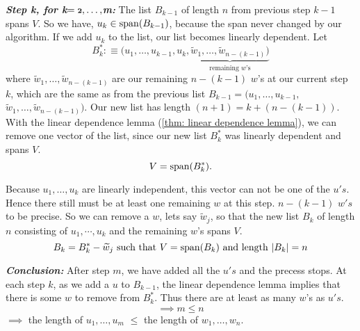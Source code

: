 \begin{prf}
  \emph{\bfseries Step k, for k$=\mathbf{\mathsmaller{2}, \ldots,}$m:} The list $B_{k-1}$ of length $n$ from previous step $k-1$ spans $V$. So we have, $u_k \in \operatorname{span} (B_{k-1})$, because the span never changed by our algorithm. If we add $u_k$ to the list, our list becomes linearly dependent. Let
  \begin{equation*}
    B_k^* :\equiv (u_1, \ldots, u_{k-1}, u_k, \underbrace{\widetilde w_{1}, \ldots, \widetilde w_{n-(k-1)})}_{\text{remaining $w$'s}} 
  \end{equation*}
  where $\widetilde w_{1}, \ldots, \widetilde w_{n-(k-1)}$ are our remaining $n-(k-1)$ $w$'s at our current step $k$, which are the same as from the previous list $B_{k-1}$$=$$(u_1, \ldots,u_{k-1},$$ \widetilde w_{1}, \ldots, \widetilde w_{n-(k-1)})$. Our new list has length $(n+1) = k + (n-(k-1))$. With the linear dependence lemma (\ref{thm: linear dependence lemma}), we can remove one vector of the list, since our new list $B_{k}^*$ was linearly dependent and spans $V$. 
  \begin{equation*}
    V=\operatorname{span} (B_{k}^*). 
  \end{equation*}
  
  Because $u_1, \ldots, u_k$ are linearly independent, this vector can not be one of the $u's$. Hence there still must be at least one remaining $w$ at this step. $n-(k-1)$ $w's$ to be precise. So we can remove a $w$, lets say $\widetilde w_j$, so that the new list $B_k$ of length $n$ consisting of $u_1, \cdots, u_k$ and the remaining $w$'s spans $V$. 
  \begin{equation*}
    B_k = B_k^* - \widetilde w_j$ such that $ V=\myspan{B_k}$ and length $|B_k|=n
  \end{equation*}
  
  \emph{\bfseries Conclusion:} After step $m$, we have added all the $u's$ and the precess stops. At each step $k$, as we add a $u$ to $B_{k-1}$, the linear dependence lemma implies that there is some $w$ to remove from $B_{k}^*$. Thus there are at least as many $w$'s as $u's$.
  \begin{equation*}
    \implies m \leq n
  \end{equation*}
  $\implies$ the length of $u_1, \ldots, u_m$ $\leq$ the length of $w_1, \ldots, w_n$.
\end{prf}

